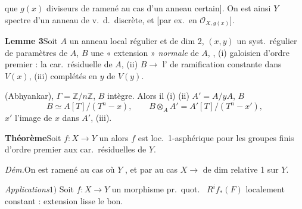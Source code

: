\documentclass[11pt,a4paper]{article}
\begin{document}

\ill{} que $g(x)$ \ill{} \ill{} diviseurs de \ill{} \ill{} ramené au cas
\ill{} d'un anneau \ill{}  \ill{}
certain]. On est ainsi \ill{} \ill{} \ill{} $Y$  spectre \ill{}
d'un anneau de v.\ d.\ discrète, et \ill{} \ill{} [par ex.\ en \ill{}
$\mathcal{O}_{X,g(x)}$].

\textbf{Lemme 3}\quad Soit $A$ un anneau local régulier et de dim 2, $(x,y)$
un syst.\ régulier de paramètres de $A$, $B$ une « extension » \emph{normale}
de $A$,  \ill{}, (i) \ill{} \ill{} galoisien d'ordre
premier \ill{} : \ill{} la car.\ résiduelle de $A$, (ii) $B \to$ \ill{}
l'\ill{} de ramification \ill{} constante dans $V(x)$, (iii) \ill{} \ill{}
complétés en \ill{} \ill{} $y$ de $V(y)$.


\ill{} (Abhyankar), \ill{} \ill{} $\Gamma = \mathbb{Z}/n\mathbb{Z}$, $B$ \ill{}
intègre. Alors il \ill{} \ill{} (i) \ill{} (ii) \ill{} \ill{} $A' = A/yA$,
\ill{} \ill{} $B$ \ill{} \ill{}
\[
B \simeq A[T]/(T^{n} - x), \qquad B \otimes_{A} A' = A'[T]/(T^{n} - x'),
\]
\ill{} $x'$ \ill{} l'image de $x$ dans $A'$, \ill{} \ill{} \ill{} \ill{}
\ill{} \ill{} (iii).


\textbf{Théorème}\quad Soit 
 $f : X \to Y$  un
  \struck{\ill{}} alors $f$ est loc.\
1-asphérique \ill{} pour les groupes finis d'ordre premier aux car.\
résiduelles de $Y$.


\emph{Dém.}\quad On est \ill{} ramené au cas où $Y$ 
, et par \ill{} \ill{} au cas \ill{} $X \to$ \ill{}
de dim relative 1 sur $Y$. \ill{}

\emph{Applications}\quad $1)$ Soit $f : X \to Y$ un morphisme pr.\ quot.\
 \ill{} \ill{} $R^{i} f_{*}(F)$ localement constant : \ill{}
extension \ill{} \ill{} lisse \ill{} le bon.

\struck{$2)$ Soit $X$}
\end{document}
